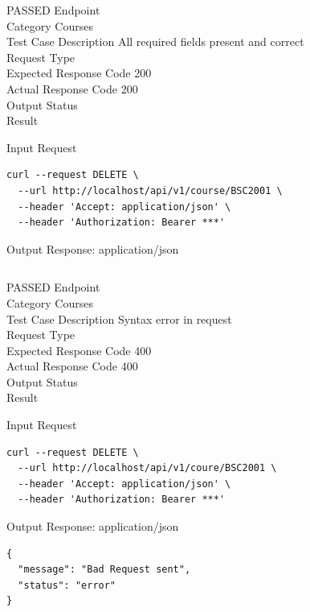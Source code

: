 \begin{testcase}{69}{PASSED}
Endpoint \hfill {}\\
Category \hfill Courses\\
Test Case Description \hfill All required fields present and correct\\

Request Type    \hfill {}\\
Expected Response Code    \hfill 200\\
Actual Response Code    \hfill 200\\

Output Status \hfill {}\\
Result \hfill {}

\begin{ipblock}{Input Request}
\begin{verbatim}
curl --request DELETE \
  --url http://localhost/api/v1/course/BSC2001 \
  --header 'Accept: application/json' \
  --header 'Authorization: Bearer ***'
\end{verbatim}
\end{ipblock}

\begin{opblock}{Output Response: application/json}
\begin{verbatim}

\end{verbatim}
\end{opblock}
\end{testcase}

\begin{testcase}{70}{PASSED}
Endpoint \hfill {}\\
Category \hfill Courses\\
Test Case Description \hfill Syntax error in request\\

Request Type    \hfill {}\\
Expected Response Code    \hfill 400\\
Actual Response Code    \hfill 400\\

Output Status \hfill {}\\
Result \hfill \tcstatus{PASSED}

\begin{ipblock}{Input Request}
\begin{verbatim}
curl --request DELETE \
  --url http://localhost/api/v1/coure/BSC2001 \
  --header 'Accept: application/json' \
  --header 'Authorization: Bearer ***'
\end{verbatim}
\end{ipblock}

\begin{opblock}{Output Response: application/json}
\begin{verbatim}
{
  "message": "Bad Request sent",
  "status": "error"
}
\end{verbatim}
\end{opblock}
\end{testcase}

